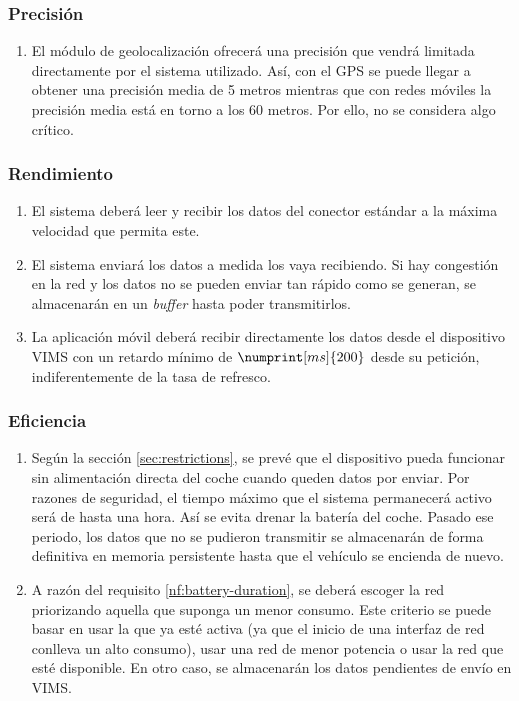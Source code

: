 \subsubsection{Precisión}
\begin{enumerate}[label=\textbf{\texttt{RNF-\arabic*}}]
  \item\label{nf:accuracy} El módulo de geolocalización ofrecerá una precisión
  que vendrá limitada directamente por el sistema utilizado. Así, con el GPS se
  puede llegar a obtener una precisión media de 5 metros mientras que con redes
  móviles la precisión media está en torno a los 60 metros. Por ello, no se considera algo crítico.
\end{enumerate}

\subsubsection{Rendimiento}
\begin{enumerate}[resume, label=\textbf{\texttt{RNF-\arabic*}}]
  \item\label{nf:read-speed} El sistema deberá leer y recibir los datos del
  conector estándar a la máxima velocidad que permita este.
  \item\label{nf:transmission-speed} El sistema enviará los datos a medida los
  vaya recibiendo. Si hay congestión en la red y los datos no se pueden enviar tan
  rápido como se generan, se almacenarán en un \textit{buffer} hasta poder transmitirlos.
  \item\label{nf:rt-viewer} La aplicación móvil deberá recibir directamente los
  datos desde el dispositivo \ac{VIMS} con un retardo mínimo de $\numprint[ms]{200}$
  desde su petición, indiferentemente de la tasa de refresco.
\end{enumerate}


\subsubsection{Eficiencia}
\begin{enumerate}[resume, label=\textbf{\texttt{RNF-\arabic*}}]
  \item\label{nf:battery-duration} Según la sección \ref{sec:restrictions},
  se prevé que el dispositivo pueda funcionar sin alimentación directa del coche
  cuando queden datos por enviar. Por razones de seguridad, el tiempo máximo que
  el sistema permanecerá activo será de hasta una hora. Así se evita drenar la
  batería del coche. Pasado ese periodo, los datos que no se pudieron transmitir
  se almacenarán de forma definitiva en memoria persistente hasta que el vehículo
  se encienda de nuevo.
  \item\label{nf:network-election} A razón del requisito \ref{nf:battery-duration},
  se deberá escoger la red priorizando aquella que suponga un menor consumo. Este
  criterio se puede basar en usar la que ya esté activa (ya que el inicio de una
  interfaz de red conlleva un alto consumo), usar una red de menor potencia o
  usar la red que esté disponible. En otro caso, se almacenarán los datos pendientes
  de envío en \ac{VIMS}.
\end{enumerate}

